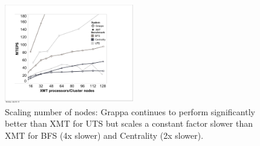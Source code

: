 \begin{figure}[ht]
    \begin{center}
      \includegraphics[width=0.5\textwidth]{figs/scaling_cropped.pdf}
    \end{center}
    \caption{Scaling number of nodes: Grappa continues to perform significantly better than XMT for UTS but scales a constant factor slower than XMT for BFS (4x slower) and Centrality (2x slower). }
    \label{fig:uts_threshold}
\end{figure}




